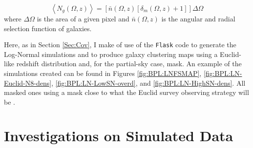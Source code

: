 \begin{equation}
\label{Eq:Poiss}
\left\langle N_g(\Omega,z) \right\rangle = \left[\bar{n}(\Omega,z)\left[ \delta_m (\Omega,z) + 1 \right] \right]\Delta\Omega
\end{equation}
where $\Delta\Omega$ is the area of a given pixel and $\bar{n}(\Omega,z)$ is the angular and radial selection function of galaxies. 

\qquad Here, as in Section \ref{Sec:Cov}, I make of use of the \texttt{Flask} code to generate the Log-Normal simulations \citep{Flask2016} and to produce galaxy clustering maps using a Euclid-like redshift distribution and, for the partial-sky case, mask. An example of the simulations created can be found in Figures \ref{fig:BPL:LNFSMAP},  \ref{fig:BPL:LN-Euclid-N8-dens}, \ref{fig:BPL:LN-LowSN-overd}, and \ref{fig:BPL:LN-HighSN-dens}. All masked ones using a mask  close to what the Euclid survey observing strategy will be \citep{2011EuclidRedPaper}. %


\section{Investigations on Simulated Data}
